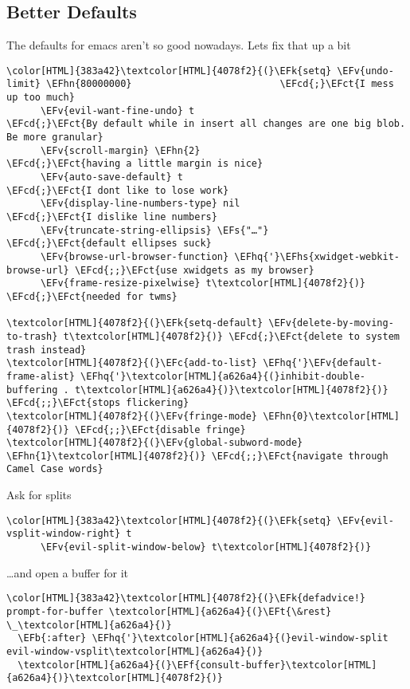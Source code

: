 \documentclass{scrartcl}
\newcommand{\EFk}[1]{\textcolor{EFk}{#1}} %
\newcommand{\EFt}[1]{\textcolor{EFt}{#1}} %
\newcommand{\EFs}[1]{\textcolor{EFs}{#1}} %
\newcommand{\EFb}[1]{\textcolor{EFb}{#1}} %
\newcommand{\EFct}[1]{\textcolor{EFct}{#1}} %
\newcommand{\EFc}[1]{\textcolor{EFc}{#1}} %
\newcommand{\EFv}[1]{\textcolor{EFv}{#1}} %
\newcommand{\EFf}[1]{\textcolor{EFf}{#1}} %
\newcommand{\EFcd}[1]{\textcolor{EFcd}{#1}} %
\newcommand{\EFhn}[1]{\textcolor{EFhn}{\textbf{#1}}} %
\newcommand{\EFhq}[1]{\textcolor{EFhq}{#1}} %
\newcommand{\EFhs}[1]{\textcolor{EFhs}{#1}} %
\begin{document}
\subsection{Better Defaults}
\label{sec:orgca8ed88}
The defaults for emacs aren't so good nowadays. Lets fix that up a bit
\begin{Code}
\begin{Verbatim}[]
\color[HTML]{383a42}\textcolor[HTML]{4078f2}{(}\EFk{setq} \EFv{undo-limit} \EFhn{80000000}                          \EFcd{;}\EFct{I mess up too much}
      \EFv{evil-want-fine-undo} t                        \EFcd{;}\EFct{By default while in insert all changes are one big blob. Be more granular}
      \EFv{scroll-margin} \EFhn{2}                              \EFcd{;}\EFct{having a little margin is nice}
      \EFv{auto-save-default} t                          \EFcd{;}\EFct{I dont like to lose work}
      \EFv{display-line-numbers-type} nil                \EFcd{;}\EFct{I dislike line numbers}
      \EFv{truncate-string-ellipsis} \EFs{"…"}                 \EFcd{;}\EFct{default ellipses suck}
      \EFv{browse-url-browser-function} \EFhq{'}\EFhs{xwidget-webkit-browse-url} \EFcd{;;}\EFct{use xwidgets as my browser}
      \EFv{frame-resize-pixelwise} t\textcolor[HTML]{4078f2}{)}                    \EFcd{;}\EFct{needed for twms}

\textcolor[HTML]{4078f2}{(}\EFk{setq-default} \EFv{delete-by-moving-to-trash} t\textcolor[HTML]{4078f2}{)} \EFcd{;}\EFct{delete to system trash instead}
\textcolor[HTML]{4078f2}{(}\EFc{add-to-list} \EFhq{'}\EFv{default-frame-alist} \EFhq{'}\textcolor[HTML]{a626a4}{(}inhibit-double-buffering . t\textcolor[HTML]{a626a4}{)}\textcolor[HTML]{4078f2}{)} \EFcd{;;}\EFct{stops flickering}
\textcolor[HTML]{4078f2}{(}\EFv{fringe-mode} \EFhn{0}\textcolor[HTML]{4078f2}{)} \EFcd{;;}\EFct{disable fringe}
\textcolor[HTML]{4078f2}{(}\EFv{global-subword-mode} \EFhn{1}\textcolor[HTML]{4078f2}{)} \EFcd{;;}\EFct{navigate through Camel Case words}
\end{Verbatim}
\end{Code}

Ask for splits
\begin{Code}
\begin{Verbatim}[]
\color[HTML]{383a42}\textcolor[HTML]{4078f2}{(}\EFk{setq} \EFv{evil-vsplit-window-right} t
      \EFv{evil-split-window-below} t\textcolor[HTML]{4078f2}{)}
\end{Verbatim}
\end{Code}

\ldots{}and open a buffer for it
\begin{Code}
\begin{Verbatim}[]
\color[HTML]{383a42}\textcolor[HTML]{4078f2}{(}\EFk{defadvice!} prompt-for-buffer \textcolor[HTML]{a626a4}{(}\EFt{\&rest} \_\textcolor[HTML]{a626a4}{)}
  \EFb{:after} \EFhq{'}\textcolor[HTML]{a626a4}{(}evil-window-split evil-window-vsplit\textcolor[HTML]{a626a4}{)}
  \textcolor[HTML]{a626a4}{(}\EFf{consult-buffer}\textcolor[HTML]{a626a4}{)}\textcolor[HTML]{4078f2}{)}
\end{Verbatim}
\end{Code}
\end{document}
